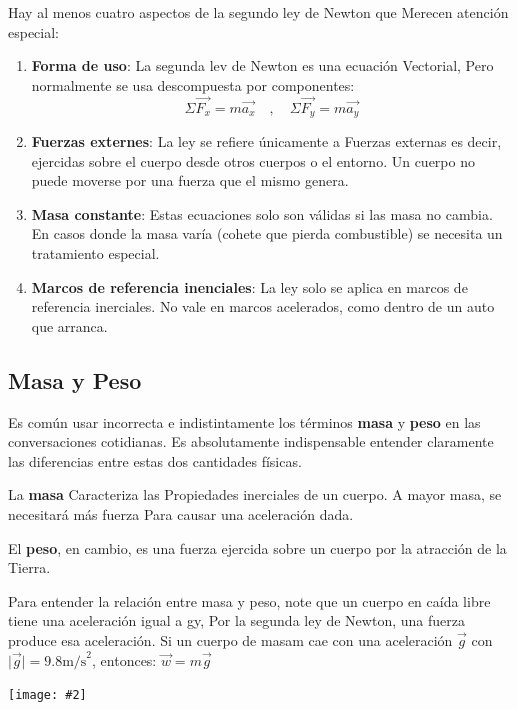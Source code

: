 \documentclass{article}
\newcommand{\newsubsection}[1]{
    \vspace{0.5cm}
    \color{sectionColor}
    \subsection{\bl{#1}}
    \color{black}
    \vspace{0.5cm}
}
\newcommand{\bl}[1]{\textbf{#1}}
\newcommand{\ladoALado}[4]{
    \begin{minipage}[t]{#3\textwidth}
        \vspace{0pt}
        #1
    \end{minipage}
    \hfill
    \begin{minipage}[t]{#4\textwidth}
        \vspace{0pt}
        \centering
        \texttt{[image: \#2]}
    \end{minipage}
}
\begin{document}
    \par Hay al menos cuatro aspectos de la segundo ley de Newton que Merecen atención especial:

    \begin{enumerate}
        \item \bl{Forma de uso}: La segunda lev de Newton es una ecuación Vectorial, Pero normalmente se usa descompuesta por componentes:
        \[\Sigma \vec{F_x} = m \vec{a_x} \quad , \quad \Sigma \vec{F_y} = m \vec{a_y}\]

        \item \bl{Fuerzas externes}: La ley se refiere únicamente a Fuerzas externas es decir, ejercidas sobre el cuerpo desde otros cuerpos o el entorno. Un cuerpo no puede moverse por una fuerza que el mismo genera.
        \item \bl{Masa constante}: Estas ecuaciones solo son válidas si las masa no cambia. En casos donde la masa varía (cohete que pierda combustible) se necesita un tratamiento especial.
        \item \bl{Marcos de referencia inenciales}: La ley solo se aplica en marcos de referencia inerciales. No vale en marcos acelerados, como dentro de un auto que arranca.
    \end{enumerate}

    \newsubsection{Masa y Peso}

    \ladoALado{
        \par Es común usar incorrecta e indistintamente los términos \bl{masa} y \bl{peso} en las conversaciones cotidianas. Es absolutamente indispensable entender claramente las diferencias entre estas dos cantidades físicas.

        \par La \bl{masa} Caracteriza las Propiedades inerciales de un cuerpo. A mayor masa, se necesitará más fuerza Para causar una aceleración dada.

        \par El \bl{peso}, en cambio, es una fuerza ejercida sobre un cuerpo por la atracción de la Tierra.

        \par Para entender la relación entre masa y peso, note que un cuerpo en caída libre tiene una aceleración igual a gy, Por la segunda ley de Newton, una fuerza produce esa aceleración. Si un cuerpo de masam cae con una aceleración $\vec{g}$ con $ \lvert \vec{g} \rvert = 9.8 \text{m/s}^2 $, entonces: $\vec{w} = m \vec{g}$
    }{img/2.4-1.png}{0.7}{0.3}
\end{document}
